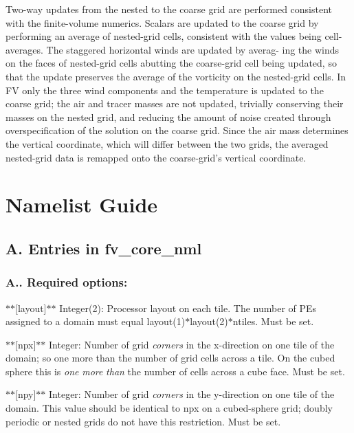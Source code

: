 Two-\/way updates from the nested to the coarse grid are performed consistent with the finite-\/volume numerics. Scalars are updated to the coarse grid by performing an average of nested-\/grid cells, consistent with the values being cell-\/averages. The staggered horizontal winds are updated by averag-\/ ing the winds on the faces of nested-\/grid cells abutting the coarse-\/grid cell being updated, so that the update preserves the average of the vorticity on the nested-\/grid cells. In F\-V only the three wind components and the temperature is updated to the coarse grid; the air and tracer masses are not updated, trivially conserving their masses on the nested grid, and reducing the amount of noise created through overspecification of the solution on the coarse grid. Since the air mass determines the vertical coordinate, which will differ between the two grids, the averaged nested-\/grid data is remapped onto the coarse-\/grid’s vertical coordinate. \hypertarget{namelist}{}\section{Namelist Guide}\label{namelist}
\subsection*{A. Entries in fv\-\_\-core\-\_\-nml}

\subsubsection*{A.. Required options\-:}

$\ast$$\ast$\mbox{[}layout\mbox{]}$\ast$$\ast$ Integer(2)\-: Processor layout on each tile. The number of P\-Es assigned to a domain must equal layout(1)$\ast$layout(2)$\ast$ntiles. Must be set.

$\ast$$\ast$\mbox{[}npx\mbox{]}$\ast$$\ast$ Integer\-: Number of grid {\itshape corners} in the x-\/direction on one tile of the domain; so one more than the number of grid cells across a tile. On the cubed sphere this is {\itshape one} {\itshape more} {\itshape than} the number of cells across a cube face. Must be set.

$\ast$$\ast$\mbox{[}npy\mbox{]}$\ast$$\ast$ Integer\-: Number of grid {\itshape corners} in the y-\/direction on one tile of the domain. This value should be identical to npx on a cubed-\/sphere grid; doubly periodic or nested grids do not have this restriction. Must be set.


